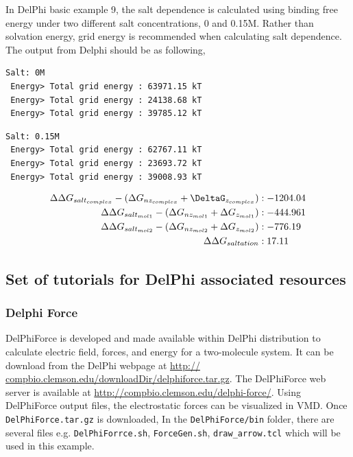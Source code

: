 \documentclass[9pt,tutorial]{livecoms}
\begin{document}
In DelPhi basic example 9, the salt dependence is calculated using binding free energy under two different salt concentrations, 0 and 0.15M. Rather than solvation energy, grid energy is recommended when calculating salt dependence. The output from Delphi should be as following,

\begin{verbatim}
Salt: 0M 
 Energy> Total grid energy : 63971.15 kT
 Energy> Total grid energy : 24138.68 kT
 Energy> Total grid energy : 39785.12 kT
\end{verbatim}

\begin{verbatim}
Salt: 0.15M
 Energy> Total grid energy : 62767.11 kT
 Energy> Total grid energy : 23693.72 kT
 Energy> Total grid energy : 39008.93 kT
\end{verbatim}

\begin{equation}
\begin{aligned}
\Delta\Delta G_{salt_{complex}} - (\Delta G_{nz_{complex}} + \DeltaG_{z_{complex}}) &: -1204.04 \nonumber \\
\Delta\Delta G_{salt_{mol1}} - (\Delta G_{nz_{mol1}} + \Delta G_{z_{mol1}}) &: -444.961 \nonumber \\
\Delta\Delta G_{salt_{mol2}} - (\Delta G_{nz_{mol2}} + \Delta G_{z_{mol2}}) &: -776.19 \nonumber \\
\Delta\Delta G_{saltation} &: 17.11 \nonumber 
\end{aligned}
\end{equation}


\subsection{Set of tutorials for DelPhi associated resources}
\subsubsection{Delphi Force}
DelPhiForce\cite{li2017delphiforce} is developed and made available within DelPhi distribution to calculate electric field, forces, and energy for a two-molecule system. It can be download from the DelPhi webpage at \url{http:// compbio.clemson.edu/downloadDir/delphiforce.tar.gz}. The DelPhiForce web server is available at \url{http://compbio.clemson.edu/delphi-force/}. Using DelPhiForce output files, the electrostatic forces can be visualized in VMD\cite{humphrey1996vmd}. Once \texttt{DelPhiForce.tar.gz} is downloaded, In the \texttt{DelPhiForce/bin} folder, there are several files e.g. 
\texttt{DelPhiForrce.sh}, \texttt{ForceGen.sh}, \texttt{draw\_arrow.tcl} which will be used in this example.
\end{document}
